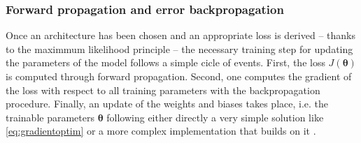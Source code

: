\subsubsection{Forward propagation and error backpropagation}
Once an architecture has been chosen and an appropriate loss is derived -- thanks to the maximmum likelihood principle -- the necessary training step for updating the parameters of the model follows a simple cicle of events. First, the loss $J(\bm{\theta})$ is computed  through forward propagation. Second, one computes the gradient of the loss with respect to all training parameters with the backpropagation procedure. Finally, an update of the weights and biases takes place, i.e. the trainable parameters $\bm{\theta}$ following either directly a very simple solution like \cref{eq:gradientoptim} or a more complex implementation that builds on it \citep{Goodfellow2016}. 
